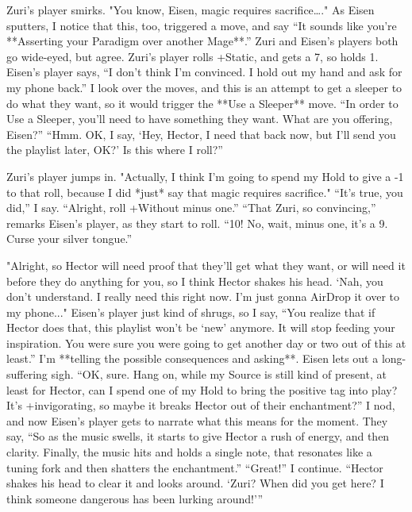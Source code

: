 \documentclass[
  oneside,
  statementpaper,
  9pt]{memoir}
\begin{document}
\begin{MC}
Zuri’s player smirks. "You know, Eisen, magic requires sacrifice…." As Eisen sputters, I notice that this, too, triggered a move, and say “It sounds like you’re **Asserting your Paradigm over another Mage**.” Zuri and Eisen’s players both go wide-eyed, but agree. Zuri’s player rolls +Static, and gets a 7, so holds 1. Eisen’s player says, “I don’t think I’m convinced. I hold out my hand and ask for my phone back.” I look over the moves, and this is an attempt to get a sleeper to do what they want, so it would trigger the **Use a Sleeper** move. “In order to Use a Sleeper, you’ll need to have something they want. What are you offering, Eisen?” “Hmm. OK, I say, ‘Hey, Hector, I need that back now, but I’ll send you the playlist later, OK?’ Is this where I roll?”

Zuri’s player jumps in. "Actually, I think I’m going to spend my Hold to give a -1 to that roll, because I did *just* say that magic requires sacrifice." “It’s true, you did,” I say. “Alright, roll +Without minus one.” “That Zuri, so convincing,” remarks Eisen’s player, as they start to roll. “10! No, wait, minus one, it’s a 9. Curse your silver tongue.”

"Alright, so Hector will need proof that they’ll get what they want, or will need it before they do anything for you, so I think Hector shakes his head. ‘Nah, you don’t understand. I really need this right now. I’m just gonna AirDrop it over to my phone..." Eisen’s player just kind of shrugs, so I say, “You realize that if Hector does that, this playlist won’t be ‘new’ anymore. It will stop feeding your inspiration. You were sure you were going to get another day or two out of this at least.” I’m **telling the possible consequences and asking**. Eisen lets out a long-suffering sigh. “OK, sure. Hang on, while my Source is still kind of present, at least for Hector, can I spend one of my Hold to bring the positive tag into play? It’s +invigorating, so maybe it breaks Hector out of their enchantment?” I nod, and now Eisen’s player gets to narrate what this means for the moment. They say, “So as the music swells, it starts to give Hector a rush of energy, and then clarity. Finally, the music hits and holds a single note, that resonates like a tuning fork and then shatters the enchantment.” “Great!” I continue. “Hector shakes his head to clear it and looks around. ‘Zuri? When did you get here? I think someone dangerous has been lurking around!’”

\end{MC}
\end{document}
